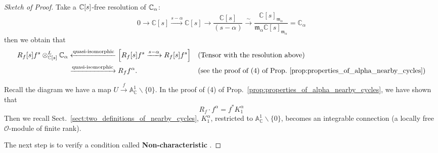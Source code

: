 \begin{proof}[Sketch of Proof]

    Take a $\mathbb{C}[s]$-free resolution of $\mathbb{C}_\alpha$:
    \begin{equation*}
        0\longrightarrow \mathbb{C}[s]\xrightarrow{s-\alpha} \mathbb{C}[s]\longrightarrow \frac{\mathbb{C}[s]}{(s-\alpha)}\stackrel{\sim}{\longrightarrow}\frac{\mathbb{C}[s]_{\mathfrak{m}_\alpha}}{\mathfrak{m}_\alpha\mathbb{C}[s]_{\mathfrak{m}_\alpha}}=\mathbb{C}_{\alpha}
    \end{equation*}
    then we obtain that
    \begin{align*}
        R_f[s]f^s \otimes^L_{\mathbb{C}[s]} \mathbb{C}_\alpha & \xleftarrow{\substack{\text{quasi-isomorphic}}}\left[ R_f[s]f^s \xrightarrow{s-\alpha} R_f[s]f^s \right] &  & \text{(Tensor with the resolution above)}                                           \\
                                                              & \xrightarrow{\substack{\text{quasi-isomorphic}}} R_f f^\alpha.                                           &  & \text{(see the proof of (4) of Prop.~\ref{prop:properties_of_alpha_nearby_cycles})}
    \end{align*}

    Recall the diagram we have a map $U\xrightarrow{f}\mathbb{A}^{1}_{\mathbb{C}}\backslash\{0\}$.
    In the proof of (4) of Prop.~\ref{prop:properties_of_alpha_nearby_cycles}, we have shown that
    \[
        R_f \cdot f^\alpha = f^* K_1^\alpha
    \]
    Then we recall Sect.~\ref{sect:two_definitions_of_nearby_cycles}, $K_1^\alpha$, restricted to $\mathbb{A}^1_{\mathbb{C}}\backslash\{0\}$, becomes an integrable connection (a locally free $\mathcal{O}$-module of finite rank).

    \medskip

    The next step is to verify a condition called \textbf{Non-characteristic} \cite[Definition~2.4.2]{hotta2008d}.


\end{proof}

